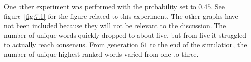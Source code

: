 One other experiment was performed with the probability set to $0.45$. See figure~\ref{fig:7.1} for the figure related to this experiment. The other graphs have not been included because they will not be relevant to the discussion. The number of unique words quickly dropped to about five, but from five it struggled to actually reach consensus. From generation $61$ to the end of the simulation, the number of unique highest ranked words varied from one to three.  
\begin{figure}[htbp]
    \centering
    \hfill
    \par\bigskip

\end{figure}
